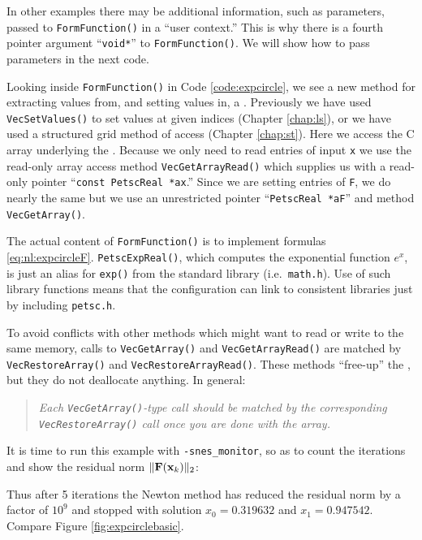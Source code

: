In other examples there may be additional information, such as parameters, passed to \texttt{FormFunction()} in a ``user context.''  This is why there is a fourth pointer argument ``\texttt{void*}'' to \texttt{FormFunction()}.  We will show how to pass parameters in the next code.

Looking inside \texttt{FormFunction()} in Code \ref{code:expcircle}, we see a new method for extracting values from, and setting values in, a \pVec.  Previously we have used \texttt{VecSetValues()} to set values at given indices (Chapter \ref{chap:ls}), or we have used a \pDMDA structured grid method of access (Chapter \ref{chap:st}).  Here we access the C array underlying the \pVec.  Because we only need to read entries of input \pVec \texttt{x} we use the read-only array access method \texttt{VecGetArrayRead()} which supplies us with a read-only pointer ``\texttt{const PetscReal *ax}.''  Since we are setting entries of \pVec \texttt{F}, we do nearly the same but we use an unrestricted pointer ``\texttt{PetscReal *aF}'' and method \texttt{VecGetArray()}.

The actual content of \texttt{FormFunction()} is to implement formulas \eqref{eq:nl:expcircleF}.  \texttt{PetscExpReal()}, which computes the exponential function $e^x$, is just an alias for \texttt{exp()} from the standard library (i.e.~\texttt{math.h}).  Use of such \PETSc library functions means that the \PETSc configuration can link to consistent libraries just by including \texttt{petsc.h}.

To avoid conflicts with other methods which might want to read or write to the same memory, calls to \texttt{VecGetArray()} and \texttt{VecGetArrayRead()} are matched by \texttt{VecRestoreArray()} and \texttt{VecRestoreArrayRead()}.  These methods ``free-up''  the \pVecs, but they do not deallocate anything.  In general:
\begin{quote}
\emph{Each \emph{\texttt{VecGetArray()}}-type call should be matched by the corresponding \emph{\texttt{VecRestoreArray()}} call once you are done with the array.}
\end{quote}

It is time to run this example with \texttt{-snes\_monitor}, so as to count the iterations and show the residual norm $\|\mathbf{F}(\mathbf{x}_k)\|_2$:
Thus after 5 iterations the Newton method has reduced the residual norm by a factor of $10^9$ and stopped with solution $x_0=0.319632$ and $x_1=0.947542$.  Compare Figure \ref{fig:expcirclebasic}.

